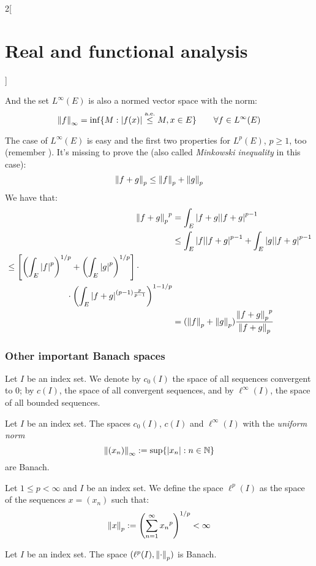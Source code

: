 \documentclass[../../../main_math.tex]{subfiles}
\begin{document}
\begin{multicols}{2}[\section{Real and functional analysis}]
\begin{proposition}
    And the set $L^\infty(E)$ is also a normed vector space with the norm: $$\left\|{f}\right\|_\infty=\inf \{M:\abs{{f}(x)}\overset{\text{a.e.}}{\leq} M, x\in E\}\qquad\forall{f}\in L^\infty(E)$$
  \end{proposition}
  \begin{sproof}
    The case of $L^\infty(E)$ is easy and the first two properties for $L^p(E)$, $p\geq 1$, too (remember ). It's missing to prove the  (also called \emph{Minkowski inequality} in this case): $$\left\|f+g\right\|_p\leq \left\|f\right\|_p+\left\|g\right\|_p$$
    We have that:
    \begin{align*}
      {\left\|f+g\right\|_p}^p & =\int_E\abs{f+g}\abs{f+g}^{p-1}                                            \\
                       & \leq \int_E\abs{f}\abs{f+g}^{p-1}+\int_E\abs{g}\abs{f+g}^{p-1}             \\
      \begin{split}
        & \leq \left[{\left(\int_E\abs{f}^p\right)}^{1/p}+{\left(\int_E\abs{g}^p\right)}^{1/p}\right]\cdot \\
        &\hspace{2.5cm}\cdot{\left(\int_E\abs{f+g}^{(p-1)\frac{p}{p-1}}\right)}^{1-1/p}
      \end{split} \\
                       & =(\left\|f\right\|_p+\left\|g\right\|_p)\frac{{\left\|f+g\right\|_p}^p }{{\left\|f+g\right\|_p}}
    \end{align*}
  \end{sproof}
  \subsubsection{Other important Banach spaces}
  \begin{definition}
    Let $I$ be an index set. We denote by $c_0(I)$ the space of all sequences convergent to 0; by $c(I)$, the space of all convergent sequences, and by $\ell^\infty(I)$, the space of all bounded sequences.
  \end{definition}
  \begin{proposition}
    Let $I$ be an index set. The spaces $c_0(I)$, $c(I)$ and $\ell^\infty(I)$ with the \emph{uniform norm} $$\left\|(x_n)\right\|_\infty:=\sup\{\abs{x_n}:n\in\mathbb{N}\}$$
    are Banach.
  \end{proposition}
  \begin{definition}
    Let $1\leq p<\infty$ and $I$ be an index set. We define the space $\ell^p(I)$ as the space of the sequences $x=(x_n)$ such that:
    $$\left\|x\right\|_p:={\left(\sum_{n=1}^\infty{x_n}^p\right)}^{1/p}<\infty$$
  \end{definition}
  \begin{proposition}
    Let $I$ be an index set. The space $(\ell^p(I),\left\|\cdot\right\|_p)$ is Banach.
  \end{proposition}

\end{multicols}
\end{document}
